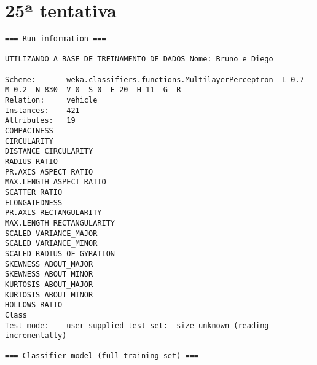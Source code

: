 \documentclass[
	article,			%
	11pt,				%
	oneside,			%
	a4paper,			%
	english,			%
	brazil,				%
	sumario=tradicional
	]{abntex2}
\begin{document}
\section{25ª tentativa}

\begin{lstlisting}
=== Run information ===

UTILIZANDO A BASE DE TREINAMENTO DE DADOS Nome: Bruno e Diego

Scheme:       weka.classifiers.functions.MultilayerPerceptron -L 0.7 -M 0.2 -N 830 -V 0 -S 0 -E 20 -H 11 -G -R
Relation:     vehicle
Instances:    421
Attributes:   19
COMPACTNESS
CIRCULARITY
DISTANCE CIRCULARITY
RADIUS RATIO
PR.AXIS ASPECT RATIO
MAX.LENGTH ASPECT RATIO
SCATTER RATIO
ELONGATEDNESS
PR.AXIS RECTANGULARITY
MAX.LENGTH RECTANGULARITY
SCALED VARIANCE_MAJOR
SCALED VARIANCE_MINOR
SCALED RADIUS OF GYRATION
SKEWNESS ABOUT_MAJOR
SKEWNESS ABOUT_MINOR
KURTOSIS ABOUT_MAJOR
KURTOSIS ABOUT_MINOR
HOLLOWS RATIO
Class
Test mode:    user supplied test set:  size unknown (reading incrementally)

=== Classifier model (full training set) ===


\end{lstlisting}
\end{document}
